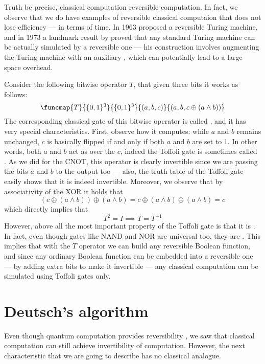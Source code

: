 \documentclass[a4paper, 12pt]{report}
\begin{document}
Truth be precise, classical computation  reversible computation. In fact, we observe that we do have examples of reversible classical computaion that does not lose efficiency --- in terms of time. In 1963 \textcite{lecerf} proposed a reversible Turing machine, and in 1973 a landmark result by \textcite{bennett} proved that any standard Turing machine can be actually simulated by a reversible one --- his construction involves augmenting the Turing machine with an auxiliary , which can potentially lead to a large space overhead.

Consider the following bitwise operator $T$, that given three bits it works as follows: $$\funcmap{T}{\{0, 1\}^3}{\{0, 1\}^3}{(a, b, c)}{(a, b, c \oplus (a \land b))}$$ The corresponding classical gate of this bitwise operator is called , and it has very special characteristics. First, observe how it computes: while $a$ and $b$ remains unchanged, $c$ is basically flipped if and only if both $a$ and $b$ are set to 1. In other words, both $a$ and $b$ act as over the  $c$, indeed the Toffoli gate is sometimes called . As we did for the CNOT, this operator is clearly invertible since we are passing the bits $a$ and $b$ to the output too --- also, the truth table of the Toffoli gate easily shows that it is indeed invertible. Moreover, we observe that by associativity of the XOR it holds that $$(c \oplus (a \land b)) \oplus (a \land b) = c \oplus (a \land b) \oplus (a \land b) = c$$ which directly implies that $$T^2 = I \implies T = T^{-1}$$ However, above all the most important property of the Toffoli gate is that it is . In fact, even though gates like NAND and NOR are universal too, they are . This implies that with the $T$ operator we can build any reversible Boolean function, and since any ordinary Boolean function can be embedded into a reversible one --- by adding extra bits to make it invertible --- any classical computation can be simulated using Toffoli gates only.

\section{Deutsch's algorithm}

Even though quantum computation provides reversibility , we saw that classical computation can still achieve invertibility of computation. However, the next characteristic that we are going to describe has no classical analogue.
\end{document}
